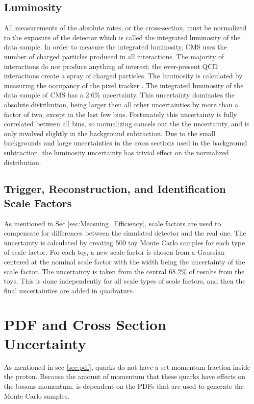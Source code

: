 \subsection{Luminosity}
All measurements of the absolute rates, or the cross-section, must be normalized to the exposure of the detector which is called the integrated luminosity of the data sample. 
In order to measure the integrated luminosity, CMS uses the number of charged particles produced in all interactions. The majority of interactions do not produce anything of interest; the ever-present QCD interactions create a spray of charged particles. The luminosity is calculated by measuring the occupancy of the pixel tracker \cite{cms_lumi_2013}\cite{vandermeer_1968}. 
The integrated luminosity of the data sample of CMS has a 2.6\% uncertainty. This uncertainty dominates the absolute \phistar distribution, being larger then  all other uncertainties by more than a factor of two, except in the last few bins. Fortunately this uncertainty is fully correlated between all \phistar bins, so  normalizing cancels out the  the uncertainty, and is only involved slightly in the background subtraction. Due to the small backgrounds and large uncertainties in the cross sections used in the background subtraction, the luminosity uncertainty has trivial effect on the normalized distribution.



\subsection{Trigger, Reconstruction, and  Identification Scale Factors}
As mentioned in Sec \ref{sec:Measuing_Efficiency}, scale factors are used to compensate for differences between the simulated detector and the real one. The uncertainty is calculated by creating 500 toy Monte Carlo samples for each type of scale factor. For each toy, a new scale factor is chosen from a Gaussian centered at the nominal scale factor with the width being the uncertainty of the scale factor. The uncertainty is taken from the central 68.2\% of results from the toys. This is done independently for all scale types of scale factors, and then the final uncertainties are added in quadrature. 



\iffalse 
\section{PDF and Cross Section Uncertainty}
As mentioned in sec \ref{sec:pdf}, quarks do not have a set momentum fraction inside the proton. Because the amount of momentum that these quarks have effects on the \Z bosons momentum, \phistar is dependent on the PDFs that are used to generate the Monte Carlo samples.

